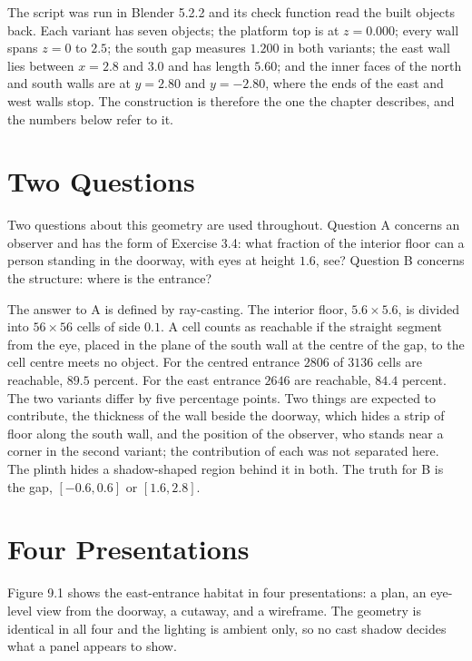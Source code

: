 

The script was run in Blender 5.2.2 and its check function read the built objects back. Each variant has seven objects; the platform top is at $z=0.000$; every wall spans $z=0$ to $2.5$; the south gap measures $1.200$ in both variants; the east wall lies between $x=2.8$ and $3.0$ and has length $5.60$; and the inner faces of the north and south walls are at $y=2.80$ and $y=-2.80$, where the ends of the east and west walls stop. The construction is therefore the one the chapter describes, and the numbers below refer to it.

\section{Two Questions}

Two questions about this geometry are used throughout. Question A concerns an observer and has the form of Exercise 3.4: what fraction of the interior floor can a person standing in the doorway, with eyes at height $1.6$, see? Question B concerns the structure: where is the entrance?

The answer to A is defined by ray-casting. The interior floor, $5.6\times5.6$, is divided into $56\times56$ cells of side $0.1$. A cell counts as reachable if the straight segment from the eye, placed in the plane of the south wall at the centre of the gap, to the cell centre meets no object. For the centred entrance $2806$ of $3136$ cells are reachable, $89.5$ percent. For the east entrance $2646$ are reachable, $84.4$ percent. The two variants differ by five percentage points. Two things are expected to contribute, the thickness of the wall beside the doorway, which hides a strip of floor along the south wall, and the position of the observer, who stands near a corner in the second variant; the contribution of each was not separated here. The plinth hides a shadow-shaped region behind it in both. The truth for B is the gap, $[-0.6,0.6]$ or $[1.6,2.8]$.

\section{Four Presentations}

Figure 9.1 shows the east-entrance habitat in four presentations: a plan, an eye-level view from the doorway, a cutaway, and a wireframe. The geometry is identical in all four and the lighting is ambient only, so no cast shadow decides what a panel appears to show.


